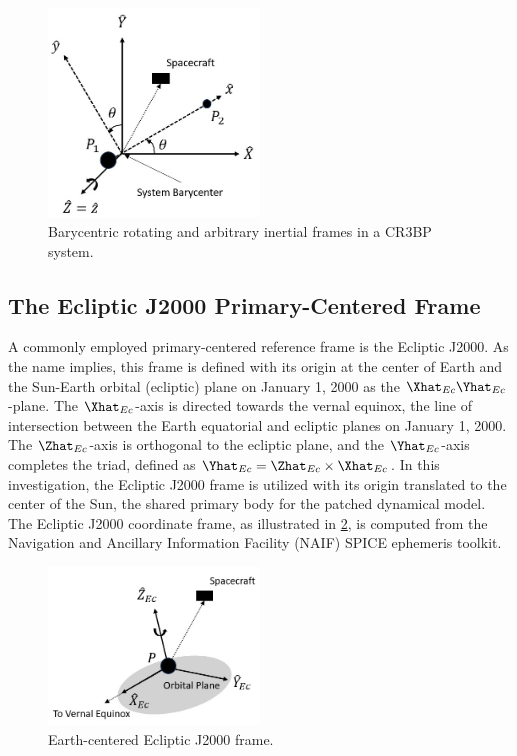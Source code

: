 \begin{figure}[H]
    \centering
    \includegraphics[width=0.5\textwidth]{figures/BaryFrames.jpg}
    \caption{Barycentric rotating and arbitrary inertial frames in a CR3BP system.}
    \label{fig:baryFrames}
\end{figure}

\subsection{The Ecliptic J2000 Primary-Centered Frame}
A commonly employed primary-centered reference frame is the Ecliptic J2000. As the name implies,
this frame is defined with its origin at the center of Earth and the Sun-Earth orbital (ecliptic)
plane on January 1, 2000 as the $\Xhat_{Ec}\Yhat_{Ec}$-plane. The $\Xhat_{Ec}$-axis is directed
towards the vernal equinox, the line of intersection between the Earth equatorial and ecliptic
planes on January 1, 2000. The $\Zhat_{Ec}$-axis is orthogonal to the ecliptic plane, and the
$\Yhat_{Ec}$-axis completes the triad, defined as $\Yhat_{Ec}=\Zhat_{Ec}\times\Xhat_{Ec}$. In this
investigation, the Ecliptic J2000 frame is utilized with its origin translated to the center of the
Sun, the shared primary body for the patched dynamical model. The Ecliptic J2000 coordinate frame,
as illustrated in \cref{fig:eclipJ2000Frame}, is computed from the Navigation and Ancillary
Information Facility (NAIF) SPICE ephemeris toolkit\cite{Semenov:2023}.

\begin{figure}[H]
    \centering
    \includegraphics[width=0.5\textwidth]{figures/EclipJ2000Frame.jpg}
    \caption{Earth-centered Ecliptic J2000 frame.}
    \label{fig:eclipJ2000Frame}
\end{figure}
